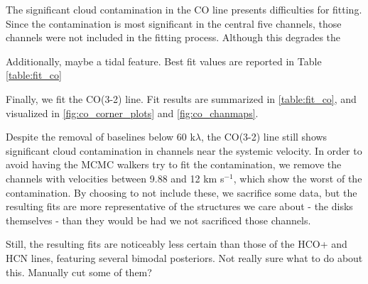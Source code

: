 The significant cloud contamination in the CO line presents difficulties for fitting. Since the contamination is most significant in the central five channels, those channels were not included in the fitting process. Although this degrades the

Additionally, maybe a tidal feature. Best fit values are reported in Table \ref{table:fit_co}


Finally, we fit the CO(3-2) line. Fit results are summarized in \ref{table:fit_co}, and visualized in \ref{fig:co_corner_plots} and \ref{fig:co_chanmaps}.


Despite the removal of baselines below 60 k$\lambda$, the CO(3-2) line still shows significant cloud contamination in channels near the systemic velocity. In order to avoid having the MCMC walkers try to fit the contamination, we remove the channels with velocities between 9.88 and 12 km s$^{-1}$, which show the worst of the contamination. By choosing to not include these, we sacrifice some data, but the resulting fits are more representative of the structures we care about - the disks themselves - than they would be had we not sacrificed those channels.

Still, the resulting fits are noticeably less certain than those of the HCO+ and HCN lines, featuring several bimodal posteriors. Not really sure what to do about this. Manually cut some of them?


